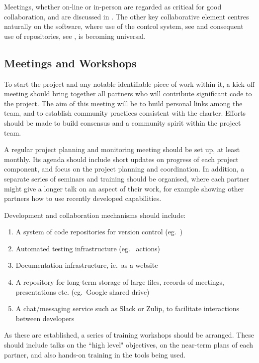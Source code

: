 
Meetings, whether on-line or in-person are regarded as critical for good collaboration,
and are discussed in . The other key collaborative element centres
naturally on the software, where use of the  control system, see 
and consequent use of repositories, see , is becoming universal.

\subsection{Meetings and Workshops} \label{sec:meet}

To start the project and any notable identifiable piece of work
within it, a kick-off meeting should bring
together all partners who will contribute significant code to the
project.  The aim of this meeting will be to build personal links
among the team, and to establish community practices consistent with the charter.
Efforts should be made to build consensus and
a community spirit within the project team.

A regular project planning and monitoring meeting should be set up,
at least monthly. Its agenda should include short updates on progress of
each project component, and focus on the project planning and
coordination. In addition, a separate series of seminars and training
should be organised, where each partner might give a longer talk on an
aspect of their work, for example showing other partners how to use
recently developed capabilities.


Development and collaboration mechanisms should include:
\begin{enumerate}
\item A system of code repositories for version control (eg.\ )
\item Automated testing infrastructure (eg.\  actions)
\item Documentation infrastructure, ie.\ as a website
\item A repository for long-term storage of large files, records of
meetings, presentations etc. (eg.\ Google shared drive)
\item A chat/messaging service such as Slack or Zulip, to facilitate interactions
between developers
\end{enumerate}
As these are established, a series of training workshops should be
arranged. These should include talks on the ``high level" objectives, 
on the near-term plans of each partner, and also hands-on training in
the tools being used. 



